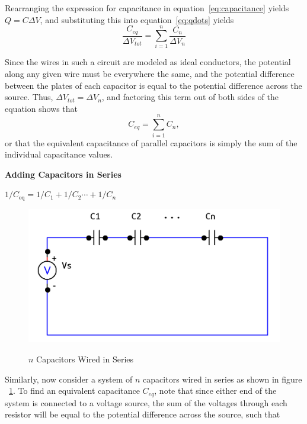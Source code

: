 \documentclass[twocolumn,english]{IEEEtran}
\theoremstyle{plain}
\theoremstyle{plain}
\begin{document}
  Rearranging the expression for capacitance in equation~\ref{eq:capacitance} yields $Q=C\Delta V$, and substituting this into equation~\ref{eq:qdots} yields
  \begin{equation*}
  \frac{C_{eq}}{\Delta V_{tot}} = \sum_{i=1}^{n} \frac{C_n}{\Delta V_n}
  \end{equation*}

  Since the wires in such a circuit are modeled as ideal conductors, the potential along any given wire must be everywhere the same, and the potential difference between the plates of each capacitor is equal to the potential difference across the source. Thus, $\Delta V_{tot} = \Delta V_n$, and factoring this term out of both sides of the equation shows that
  \begin{equation}
  C_{eq} = \sum_{i=1}^{n} C_n,
  \end{equation}
  or that the equivalent capacitance of parallel capacitors is simply the sum of the individual capacitance values.

  \noindent \hrulefill

\noindent \textbf{Adding Capacitors in Series}

\noindent$1/C_{\text{eq}}=1/C_1 + 1/C_2\cdots+1/C_n$

  \begin{figure}[h!]
  \begin{centering}
  \begin{center}
  \includegraphics[width=\linewidth]{./seriesc.png}
  \label{fig:series_diagram}
  \caption{$n$ Capacitors Wired in Series}
  \end{center}
  \par\end{centering}
  \end{figure}

  Similarly, now consider a system of $n$ capacitors wired in series as shown in figure ~\ref{fig:series_diagram}. To find an equivalent capacitance $C_{eq}$, note that since either end of the system is connected to a voltage source, the sum of the voltages through each resistor will be equal to the potential difference across the source, such that
\end{document}

